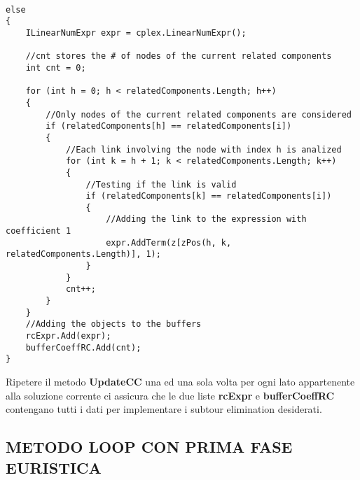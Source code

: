 \documentclass[11pt]{article}
\begin{document}
\begin{lstlisting}

else
{
    ILinearNumExpr expr = cplex.LinearNumExpr();

    //cnt stores the # of nodes of the current related components
    int cnt = 0;

    for (int h = 0; h < relatedComponents.Length; h++)
    {
        //Only nodes of the current related components are considered
        if (relatedComponents[h] == relatedComponents[i])
        {
            //Each link involving the node with index h is analized
            for (int k = h + 1; k < relatedComponents.Length; k++)
            {
                //Testing if the link is valid
                if (relatedComponents[k] == relatedComponents[i])
                {
                    //Adding the link to the expression with coefficient 1
                    expr.AddTerm(z[zPos(h, k, relatedComponents.Length)], 1);
                }
            }
            cnt++;
        }
    }
    //Adding the objects to the buffers
    rcExpr.Add(expr);
    bufferCoeffRC.Add(cnt);
}

\end{lstlisting}

Ripetere il metodo \textbf{UpdateCC} una ed una sola volta per ogni lato appartenente alla soluzione corrente ci assicura che le due liste \textbf{rcExpr} e \textbf{bufferCoeffRC} contengano tutti i dati per implementare i subtour elimination desiderati.

\subsection*{METODO LOOP CON PRIMA FASE EURISTICA}
\label{sec:LoopEuristicoS}
\end{document}
